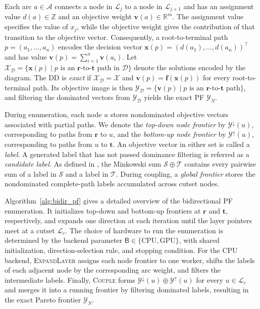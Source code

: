 \documentclass[letterpaper]{article}
\begin{document}
Each arc $a\in\mathcal{A}$ connects a node in $\mathcal{L}_j$ to a node in $\mathcal{L}_{j+1}$ and has an assignment value $d(a)\in\mathbb{Z}$ and an objective weight $\mathbf{v}(a)\in\mathbb{R}^m$. The assignment value specifies the value of $x_j$, while the objective weight gives the contribution of that transition to the objective vector. Consequently, a root-to-terminal path $p=(a_1,\dots,a_n)$ encodes the decision vector $\mathbf{x}(p)=(d(a_1),\dots,d(a_n))^\top$ and has value $\mathbf{v}(p)=\sum_{i=1}^n\mathbf{v}(a_i)$. Let $\mathcal{X}_{\mathcal{D}}=\{\mathbf{x}(p)\mid p\text{ is an }\mathbf{r}\text{-to-}\mathbf{t}\text{ path in }\mathcal{D}\}$ denote the solutions encoded by the diagram. The DD is \emph{exact} if $\mathcal{X}_{\mathcal{D}}=\mathcal{X}$ and $\mathbf{v}(p)=\mathbf{f}(\mathbf{x}(p))$ for every root-to-terminal path. Its objective image is then $\mathcal{Y}_{\mathcal{D}}=\{\mathbf{v}(p)\mid p\text{ is an }\mathbf{r}\text{-to-}\mathbf{t}\text{ path}\}$, and filtering the dominated vectors from $\mathcal{Y}_{\mathcal{D}}$ yields the exact PF $\mathcal{Y}_N$.

During enumeration, each node $u$ stores nondominated objective vectors associated with partial paths. We denote the \emph{top-down node frontier} by $\mathcal{Y}^{\downarrow}(u)$, corresponding to paths from $\mathbf{r}$ to $u$, and the \emph{bottom-up node frontier} by $\mathcal{Y}^{\uparrow}(u)$, corresponding to paths from $u$ to $\mathbf{t}$. An objective vector in either set is called a \emph{label}. A generated label that has not passed dominance filtering is referred as a \emph{candidate label}. As defined in , the Minkowski sum $\mathcal{S}\oplus\mathcal{T}$ contains every pairwise sum of a label in $\mathcal{S}$ and a label in $\mathcal{T}$. During coupling, a \emph{global frontier} stores the nondominated complete-path labels accumulated across cutset nodes.

Algorithm~\ref{alg:bidir_pf} gives a detailed overview of the bidirectional PF enumeration. It initializes top-down and bottom-up frontiers at $\mathbf{r}$ and $\mathbf{t}$, respectively, and expands one direction at each iteration until the layer pointers meet at a cutset $\mathcal{L}_c$. The choice of hardware to run the enumeration is determined by the backend parameter $\mathsf{B}\in\{\mathrm{CPU},\mathrm{GPU}\}$, with shared initialization, direction-selection rule, and stopping condition. For the CPU backend, \textsc{ExpandLayer} assigns each node frontier to one worker, shifts the labels of each adjacent node by the corresponding arc weight, and filters the intermediate labels. Finally, \textsc{Couple} forms $\mathcal{Y}^{\downarrow}(u)\oplus\mathcal{Y}^{\uparrow}(u)$ for every $u\in\mathcal{L}_c$ and merges it into a running frontier by filtering dominated labels, resulting in the exact Pareto frontier $\mathcal{Y}_N$.
\end{document}
